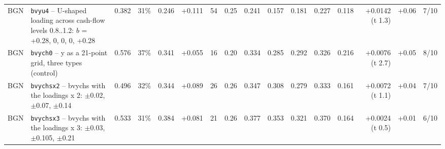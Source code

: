 \begin{landscape}
\begin{longtable}{lp{4.6cm}rrrrrrrrrrrrrr}
BGN & \texttt{bvyu4} -- U-shaped loading across cash-flow levels 0.8..1.2: $b$ = +0.28, 0, 0, 0, +0.28 & 0.382 & 31\% & 0.246 & +0.111 & 54 & 0.25 & 0.241 & 0.157 & 0.181 & 0.227 & 0.118 & +0.0142 (t 1.3) & +0.06 & 7/10 \\
BGN & \texttt{bvych0} -- y as a 21-point grid, three types (control) & 0.576 & 37\% & 0.341 & +0.055 & 16 & 0.20 & 0.334 & 0.285 & 0.292 & 0.326 & 0.216 & +0.0076 (t 2.7) & +0.05 & 8/10 \\
BGN & \texttt{bvychsx2} -- bvychs with the loadings x 2: $\pm$0.02, $\pm$0.07, $\pm$0.14 & 0.496 & 32\% & 0.344 & +0.089 & 26 & 0.26 & 0.347 & 0.308 & 0.279 & 0.333 & 0.161 & +0.0072 (t 1.1) & +0.04 & 7/10 \\
BGN & \texttt{bvychsx3} -- bvychs with the loadings x 3: $\pm$0.03, $\pm$0.105, $\pm$0.21 & 0.533 & 31\% & 0.384 & +0.081 & 21 & 0.26 & 0.377 & 0.353 & 0.321 & 0.370 & 0.164 & +0.0024 (t 0.5) & +0.01 & 6/10 \\
\end{longtable}


\end{landscape}
